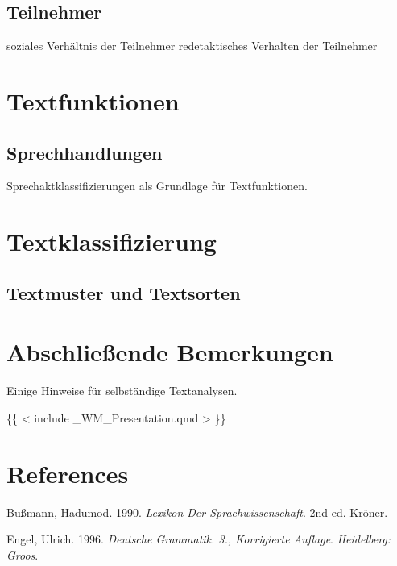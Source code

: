 \documentclass[
  letterpaper,
]{scrbook}
\newlength{\cslhangindent}
\newlength{\cslentryspacingunit} %
\newenvironment{CSLReferences}[2] %
 {%
  \setlength{\parindent}{0pt}
  \ifodd #1
  \let\oldpar\par
  \def\par{\hangindent=\cslhangindent\oldpar}
  \fi
  \setlength{\parskip}{#2\cslentryspacingunit}
 }%
 {}
\begin{document}
\hypertarget{teilnehmer}{%
\section{Teilnehmer}\label{teilnehmer}}

soziales Verhältnis der Teilnehmer redetaktisches Verhalten der
Teilnehmer

\hypertarget{textfunktionen}{%
\chapter{Textfunktionen}\label{textfunktionen}}

\hypertarget{sprechhandlungen}{%
\section{Sprechhandlungen}\label{sprechhandlungen}}

Sprechaktklassifizierungen als Grundlage für Textfunktionen.

\hypertarget{textklassifizierung}{%
\chapter{Textklassifizierung}\label{textklassifizierung}}

\hypertarget{textmuster-und-textsorten-1}{%
\section{Textmuster und Textsorten}\label{textmuster-und-textsorten-1}}


\hypertarget{abschlieuxdfende-bemerkungen}{%
\chapter{Abschließende Bemerkungen}\label{abschlieuxdfende-bemerkungen}}

Einige Hinweise für selbständige Textanalysen.

\{\{ \textless{} include \_WM\_Presentation.qmd \textgreater{} \}\}


\hypertarget{references}{%
\chapter*{References}\label{references}}

\hypertarget{refs}{}
\begin{CSLReferences}{1}{0}
\leavevmode{}%
Bußmann, Hadumod. 1990. \emph{Lexikon Der Sprachwissenschaft}. 2nd ed.
Kr{ö}ner.

\leavevmode{}%
Engel, Ulrich. 1996. \emph{Deutsche Grammatik. 3., Korrigierte Auflage}.
\emph{Heidelberg: Groos}.

\end{CSLReferences}


\backmatter

\printindex
\end{document}

